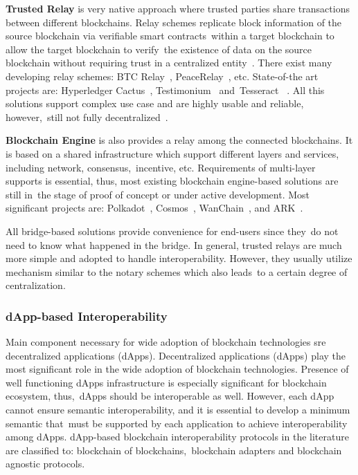 \textbf{Trusted Relay} is very native approach where trusted parties share transactions between different blockchains.
Relay schemes replicate block information of the source blockchain via verifiable smart contracts\
within a target blockchain to allow the target blockchain to verify\
the existence of data on the source blockchain without requiring trust in a centralized entity~\cite{buterin2016}.
There exist many developing relay schemes: BTC Relay~\cite{Chow2016}, PeaceRelay~\cite{Luu2019}, etc.
State-of-the art projects are: Hyperledger Cactus~\cite{Hyperledger2020}, Testimonium~\cite{Frauenthaler2020} and\
Tesseract ~\cite{cryptoeprint:2017/1153}.
All this solutions support complex use case and are highly usable and reliable, however,\
still not fully decentralized~\cite{cryptoeprint:2021/537}.

\textbf{Blockchain Engine} is also provides a relay among the connected blockchains.
It is based on a shared infrastructure which support different layers and services, including network, consensus,\
incentive, etc.
Requirements of multi-layer supports is essential, thus, most existing blockchain engine-based solutions are still in\
the stage of proof of concept or under active development.
Most significant projects are: Polkadot~\cite{cryptoeprint:2020/641}, Cosmos~\cite{Kwon2019},
WanChain~\cite{Wanchain}, and ARK~\cite{ARK}.

All bridge-based solutions provide convenience for end-users since they\
do not need to know what happened in the bridge.
In general, trusted relays are much more simple and adopted to handle interoperability.
However, they usually utilize mechanism similar to the notary schemes which also leads\
to a certain degree of centralization.

\subsubsection{dApp-based Interoperability}
Main component necessary for wide adoption of blockchain technologies sre decentralized applications (dApps).
Decentralized applications (dApps) play the most significant role in the wide adoption of blockchain technologies.
Presence of well functioning dApps infrastructure is especially significant for blockchain ecosystem, thus,\
dApps should be interoperable as well.
However, each dApp cannot ensure semantic interoperability, and it is essential to develop a minimum semantic that\
must be supported by each application to achieve interoperability among dApps.
dApp-based blockchain interoperability protocols in the literature are classified to: blockchain of blockchains,\
blockchain adapters and blockchain agnostic protocols.

